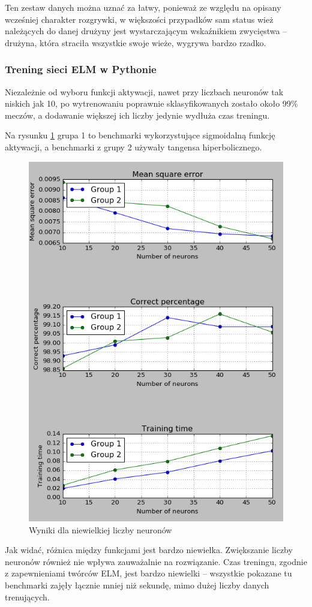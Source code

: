 \documentclass{article}
\begin{document}
Ten zestaw danych można uznać za łatwy, ponieważ ze względu na opisany wcześniej charakter rozgrywki, w większości przypadków sam status wież należących do danej drużyny jest wystarczającym wskaźnikiem zwycięstwa -- drużyna, która straciła wszystkie swoje wieże, wygrywa bardzo rzadko.
\subsubsection{Trening sieci ELM w Pythonie}
Niezależnie od wyboru funkcji aktywacji, nawet przy liczbach neuronów tak niskich jak 10, po wytrenowaniu poprawnie sklasyfikowanych zostało około 99\% meczów, a dodawanie większej ich liczby jedynie wydłuża czas treningu. 

Na rysunku \ref{wyniki_dota2_python} grupa 1 to benchmarki wykorzystujące sigmoidalną funkcję aktywacji, a benchmarki z grupy 2 używały tangensa hiperbolicznego.

\begin{figure}[H]
\centering
\includegraphics[width=\textwidth]{wyniki_dota2_python.png}
\caption{Wyniki dla niewielkiej liczby neuronów}
\label{wyniki_dota2_python}
\end{figure}
Jak widać, różnica między funkcjami jest bardzo niewielka. Zwiększanie liczby neuronów również nie wpływa zauważalnie na rozwiązanie. Czas treningu, zgodnie z zapewnieniami twórców ELM, jest bardzo niewielki -- wszystkie pokazane tu benchmarki zajęły łącznie mniej niż sekundę, mimo dużej liczby danych trenujących. 
\end{document}
